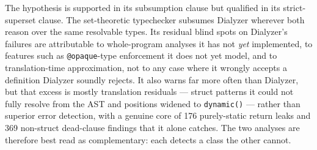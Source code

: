 The hypothesis is supported in its subsumption clause but qualified in its strict-superset clause.
The set-theoretic typechecker subsumes Dialyzer wherever both reason over the same resolvable types. Its residual blind spots on Dialyzer's failures are attributable to whole-program analyses it has not \emph{yet} implemented, to features such as \texttt{@opaque}-type enforcement it does not yet model, and to translation-time approximation, not to any case where it wrongly accepts a definition Dialyzer soundly rejects.
It also warns far more often than Dialyzer, but that excess is mostly translation residuals --- struct patterns it could not fully resolve from the AST and positions widened to \texttt{dynamic()} --- rather than superior error detection, with a genuine core of 176 purely-static return leaks and 369 non-struct dead-clause findings that it alone catches.
The two analyses are therefore best read as complementary: each detects a class the other cannot.

